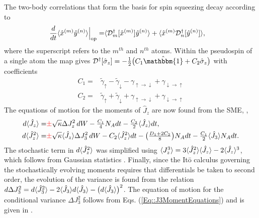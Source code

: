 \documentclass[preprint,aps,pra,onecolumn]{revtex4-1} %
\newcommand{\gammaud}{\gamma_{\uparrow \rightarrow \downarrow}}
\newcommand{\gammadu}{\gamma_{\downarrow \rightarrow \uparrow}}
\newcommand{\gammap}{\tilde{\gamma}_\uparrow + \tilde{\gamma}_\downarrow}
\newcommand{\gammam}{\tilde{\gamma}_\uparrow - \tilde{\gamma}_\downarrow}
\newcommand{\error}[1]{{\color{red} #1}}
\begin{document}
\begin{appendix}
The two-body correlations that form the basis for spin squeezing decay according to \cite{baragiola_three-dimensional_2014}
	\begin{align}
		\frac{d}{dt} \langle{ \hat{x}^{(m)} \hat{y}^{(n)} }\rangle \Big|_{\rm op}= &\langle{ \mathcal{D}_m^\dagger[ \hat{x}^{(m)}] \hat{y}^{(n)} }\rangle + \langle{ \hat{x}^{(m)} \mathcal{D}_n^\dagger[ \hat{y}^{(n)}] }\rangle,
	\end{align}
where the superscript refers to the $m^{th}$ and $n^{th}$ atoms.  Within the pseudospin of a single atom the map gives $\mathcal{D}\dg[\hat{\sigma}_z] = -\smallfrac{1}{2} \big( C_1 \hat{\mathbbm{1}} + C_2 \hat{\sigma}_z \big)$ with coefficients
	\begin{subequations} \label{Eq::DecayCoefficients2}
	\begin{align}
		C_1 =& \gammam - \gammaud + \gammadu  \\ 
		C_2 =& \gammap + \gammaud + \gammadu  
	\end{align}
	\end{subequations}	
The equations of motion for the moments of $\hat{J}_z$ are now found from the SME, , 
	\begin{subequations} \label{Eq::J3MomentEquations}
	\begin{align} 
		d \expt{\hat{J}_z} =& \error{\pm} \sqrt{\kappa} \Delta J_z^2 \, dW  - \smallfrac{C_1}{4} N_A dt - \smallfrac{C_2}{2} \expt{\hat{J}_z}dt,  \\
		d \expt{\hat{J}_z^2} %
		=& \error{\pm} \sqrt{\kappa} \expt{\hat{J}_z}\Delta J_3^2 \, dW -  C_2 \expt{\hat{J}_z^2}dt -  \big( \smallfrac{D_1 + 2C_2}{8} \big) N_A dt -  \smallfrac{C_1}{2}\expt{\hat{J}_3} N_A dt. 
	\end{align}
	\end{subequations}
The stochastic term in $d\langle{\hat{J}_z^2}\rangle$ was simplified using $\langle{J_z^3}\rangle = 3\langle{\hat{J}_z^2}\rangle\langle{\hat{J}_z}\rangle- 2\langle{\hat{J}_z}\rangle^3$, which follows from Gaussian statistics \cite{jacobs_straightforward_2006}. Finally, since the It\={o} calculus governing the stochastically evolving moments requires that differentials be taken to second order, the evolution of the variance is found from the relation $d \Delta J_3^2 = d \langle{\hat{J}_3^2}\rangle - 2 \langle{\hat{J}_3}\rangle d \langle{\hat{J}_3}\rangle - \big( d \langle{\hat{J}_3}\rangle \big)^2$. The equation of motion for the conditional variance $\Delta J_3^2$ follows from Eqs. (\ref{Eq::J3MomentEquations}) and is given in .



\end{appendix}
\end{document}

